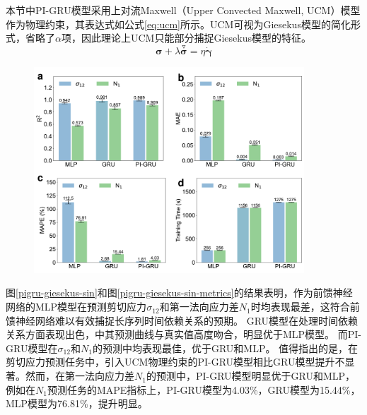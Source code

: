 本节中PI-GRU模型采用上对流Maxwell（Upper Convected Maxwell, UCM）模型作为物理约束，其表达式如公式\ref{eq:ucm}所示。UCM可视为Giesekus模型的简化形式，省略了$\alpha$项，因此理论上UCM只能部分捕捉Giesekus模型的特征。
\begin{equation}
  \boldsymbol{\sigma} + \lambda \stackrel{\triangledown}{\boldsymbol{\sigma}} = \eta \dot{\boldsymbol{\gamma}} \label{eq:ucm}
\end{equation}

\begin{figure}
  \centering
  \includegraphics[width=0.9\textwidth]{Fig/pigru-giesekus-sin-metrics.pdf}
\end{figure}
图\ref{pigru-giesekus-sin}和图\ref{pigru-giesekus-sin-metrics}的结果表明，作为前馈神经网络的MLP模型在预测剪切应力$\sigma_{12}$和第一法向应力差$N_1$时均表现最差，这符合前馈神经网络难以有效捕捉长序列时间依赖关系的预期。
GRU模型在处理时间依赖关系方面表现出色，中其预测曲线与真实值高度吻合，明显优于MLP模型。
而PI-GRU模型在$\sigma_{12}$和$N_1$的预测中均表现最佳，优于GRU和MLP。
值得指出的是，在剪切应力预测任务中，引入UCM物理约束的PI-GRU模型相比GRU模型提升不显著。然而，在第一法向应力差$N_1$的预测中，PI-GRU模型明显优于GRU和MLP，例如在$N_1$预测任务的MAPE指标上，PI-GRU模型为4.03\%，GRU模型为15.44\%，MLP模型为76.81\%，提升明显。

